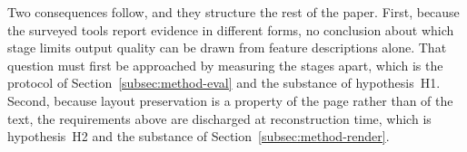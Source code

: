 Two consequences follow, and they structure the rest of the paper. First, because
the surveyed tools report evidence in different forms, no conclusion about which
stage limits output quality can be drawn from feature descriptions alone. That
question must first be approached by measuring the stages apart, which is the
protocol of Section~\ref{subsec:method-eval} and the substance of hypothesis~H1.
Second, because layout preservation is a property of the page rather than of the
text, the requirements above are discharged at reconstruction time, which is
hypothesis~H2 and the substance of Section~\ref{subsec:method-render}.
